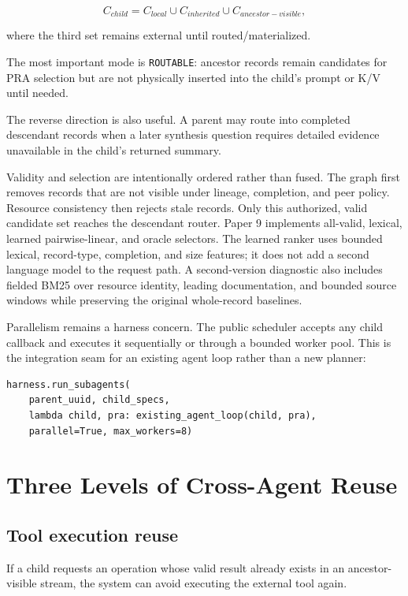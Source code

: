 \documentclass[11pt]{article}
\begin{document}
\[
C_{child} = C_{local} \cup C_{inherited} \cup C_{ancestor-visible},
\]

where the third set remains external until routed/materialized.

The most important mode is \texttt{ROUTABLE}: ancestor records remain candidates for PRA selection but are not physically inserted into the child's prompt or K/V until needed.

The reverse direction is also useful. A parent may route into completed descendant records when a later synthesis question requires detailed evidence unavailable in the child's returned summary.

Validity and selection are intentionally ordered rather than fused. The graph
first removes records that are not visible under lineage, completion, and peer
policy. Resource consistency then rejects stale records. Only this authorized,
valid candidate set reaches the descendant router. Paper 9 implements
all-valid, lexical, learned pairwise-linear, and oracle selectors. The learned
ranker uses bounded lexical, record-type, completion, and size features; it
does not add a second language model to the request path. A second-version
diagnostic also includes fielded BM25 over resource identity, leading
documentation, and bounded source windows while preserving the original
whole-record baselines.

Parallelism remains a harness concern. The public scheduler accepts any child
callback and executes it sequentially or through a bounded worker pool. This is
the integration seam for an existing agent loop rather than a new planner:

\begin{lstlisting}[basicstyle=\ttfamily\small]
harness.run_subagents(
    parent_uuid, child_specs,
    lambda child, pra: existing_agent_loop(child, pra),
    parallel=True, max_workers=8)
\end{lstlisting}

\section{Three Levels of Cross-Agent Reuse}

\subsection{Tool execution reuse}

If a child requests an operation whose valid result already exists in an ancestor-visible stream, the system can avoid executing the external tool again.
\end{document}
